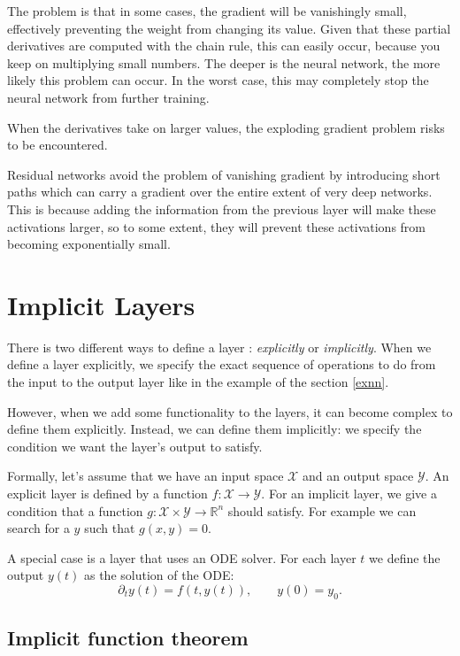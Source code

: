 \documentclass[10pt,a4paper]{article}
\theoremstyle{definition}
\theoremstyle{definition}
\theoremstyle{definition}
\begin{document}
The problem is that in some cases, the gradient will be vanishingly small, effectively preventing the weight from changing its value. Given that these partial derivatives are computed with the chain rule, this can easily occur, because you keep on multiplying small numbers. The deeper is the neural network, the more likely this problem can occur. In the worst case, this may completely stop the neural network from further training. 

When the derivatives take on larger values, the exploding gradient problem risks to be encountered.

Residual networks avoid the problem of vanishing gradient by introducing short paths which can carry a gradient over the entire extent of very deep networks. This is because adding the information from the previous layer will make these activations larger, so to some extent, they will prevent these activations from becoming exponentially small.


\section{Implicit Layers}

There is two different ways to define a layer : \textit{explicitly} or \textit{implicitly}. When we define a layer explicitly, we specify the exact sequence of operations to do from the input to the output layer like in the example of the section \ref{exnn}. 

However, when we add some functionality to the layers, it can become complex to define them explicitly. Instead, we can define them implicitly: we specify the condition we want the layer's output to satisfy. 

Formally, let's assume that we have an input space $\mathcal{X}$ and an output space $\mathcal{Y}$. An explicit layer is defined by a function $f : \mathcal{X} \rightarrow \mathcal{Y}$. For an implicit layer, we give a condition that a function $g: \mathcal{X} \times \mathcal{Y} \rightarrow \mathbb{R}^n$ should satisfy. For example we can search for a $y$ such that $g(x,y) = 0$.

A special case is a layer that uses an ODE solver. For each layer $t$ we define the output $y(t)$ as the solution of the ODE:
$$
\partial_t y(t) = f(t, y(t)), \qquad y(0) = y_0.
$$

\subsection{Implicit function theorem}
\end{document}
